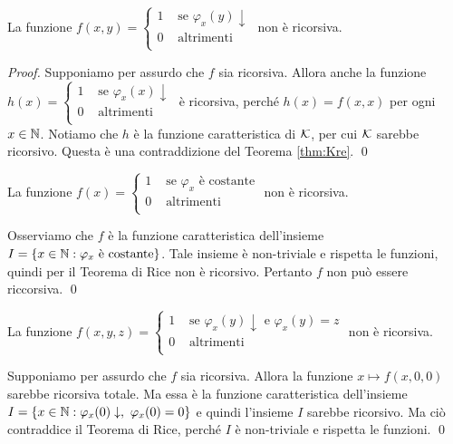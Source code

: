 \documentclass[runningheads,a4paper]{llncs}
\begin{document}
\begin{lemma}
La funzione 
$f(x,y) = 
\begin{cases}
1 & \text{ se } \varphi_x(y)\downarrow \\
0 & \text{ altrimenti } \\
\end{cases}
$
non \`{e} ricorsiva.
\end{lemma}

\begin{proof}
Supponiamo per assurdo che $f$ sia ricorsiva. Allora anche la funzione 
$h(x) = 
\begin{cases}
1 & \text{ se } \varphi_x(x)\downarrow \\
0 & \text{ altrimenti } \\
\end{cases}
$
\`{e} ricorsiva, perch\'{e} $h(x) = f(x,x)$ per ogni $x \in \mathbb{N}$. Notiamo che $h$ \`{e} la funzione caratteristica di $\mathcal{K}$, per cui
 $\mathcal{K}$ sarebbe ricorsivo. Questa \`{e} una contraddizione del Teorema \ref{thm:Kre}.
\qed\end{proof}

\begin{exercise}
La funzione
$f(x) = 
\begin{cases}
1 & \text{ se $\varphi_x$ \`{e} costante} \\
0 & \text{ altrimenti } \\
\end{cases}
$
non \`{e} ricorsiva.
\end{exercise}

\begin{solution}
Osserviamo che $f$ \`{e} la funzione caratteristica dell'insieme $I = \{x \in \mathbb{N} : \varphi_x \text{ \`{e} costante} \}$.
 Tale insieme \`{e} non-triviale e rispetta le funzioni, quindi per il Teorema di Rice non \`{e} ricorsivo. Pertanto $f$
 non pu\`{o} essere riccorsiva.
\qed\end{solution}

\begin{exercise}
La funzione
$f(x,y,z) = 
\begin{cases}
1 & \text{ se $\varphi_x(y)\downarrow$ e $\varphi_x(y) = z$} \\
0 & \text{ altrimenti } \\
\end{cases}
$
non \`{e} ricorsiva.
\end{exercise}

\begin{solution}
Supponiamo per assurdo che $f$ sia ricorsiva. Allora la funzione $x \mapsto f(x,0,0)$ sarebbe ricorsiva totale. Ma essa \`{e}
 la funzione caratteristica dell'insieme $I=\{x \in \mathbb{N} : \varphi_x(0)\downarrow,\ \varphi_x(0) = 0\}$ e quindi l'insieme
 $I$ sarebbe ricorsivo. Ma ci\`{o} contraddice il Teorema di Rice, perch\'{e} $I$ \`{e} non-triviale e rispetta le funzioni.
\qed\end{solution}
\end{document}
